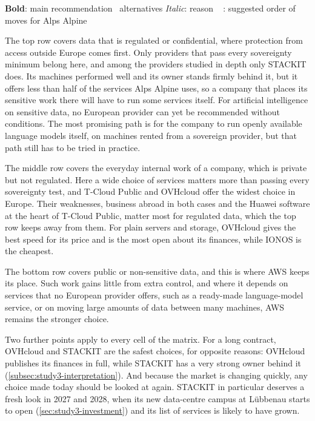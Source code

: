 \begin{table}[htbp]
  \vspace{4pt}
  {\footnotesize\raggedright
  \textbf{Bold}: main recommendation \quad
  \textbullet~alternatives \quad
  {\itshape\color{black!65}Italic}: reason \quad
  \,\,~{\setlength{\fboxsep}{1.5pt}\fbox{$\star$}}:
  suggested order of moves for Alps Alpine\par}
\end{table}

The top row covers data that is regulated or confidential, where protection from
access outside Europe comes first. Only providers that pass every sovereignty
minimum belong here, and among the providers studied in depth only STACKIT does.
Its machines performed well and its owner stands firmly behind it, but it offers
less than half of the services Alps Alpine uses, so a company that places its
sensitive work there will have to run some services itself. For artificial
intelligence on sensitive data, no European provider can yet be recommended
without conditions. The most promising path is for the company to run openly
available language models itself, on machines rented from a sovereign provider,
but that path still has to be tried in practice.

The middle row covers the everyday internal work of a company, which is private
but not regulated. Here a wide choice of services matters more than passing every
sovereignty test, and T-Cloud Public and OVHcloud offer the widest choice in
Europe. Their weaknesses, business abroad in both cases and the Huawei software
at the heart of T-Cloud Public, matter most for regulated data, which the top row
keeps away from them. For plain servers and storage, OVHcloud gives the best speed
for its price and is the most open about its finances, while IONOS is the
cheapest.

The bottom row covers public or non-sensitive data, and this is where \acs{AWS}
keeps its place. Such work gains little from extra control, and where it depends
on services that no European provider offers, such as a ready-made language-model
service, or on moving large amounts of data between many machines, \acs{AWS}
remains the stronger choice.

Two further points apply to every cell of the matrix. For a long contract,
OVHcloud and STACKIT are the safest choices, for opposite reasons: OVHcloud
publishes its finances in full, while STACKIT has a very strong owner behind it
(\cref{subsec:study3-interpretation}). And because the market is changing
quickly, any choice made today should be looked at again. STACKIT in particular
deserves a fresh look in 2027 and 2028, when its new data-centre campus at
L\"ubbenau starts to open (\cref{sec:study3-investment}) and its list of services
is likely to have grown.

